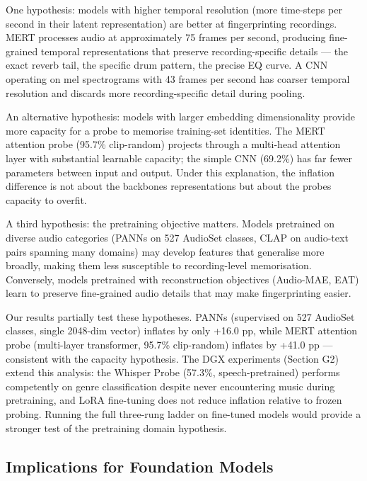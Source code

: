 \documentclass[conference]{IEEEtran}
\begin{document}
One hypothesis: models with higher temporal resolution (more time-steps
per second in their latent representation) are better at fingerprinting
recordings. MERT processes audio at approximately 75 frames per second,
producing fine-grained temporal representations that preserve
recording-specific details --- the exact reverb tail, the specific
drum pattern, the precise EQ curve. A CNN operating on mel spectrograms
with 43 frames per second has coarser temporal resolution and discards
more recording-specific detail during pooling.

An alternative hypothesis: models with larger embedding dimensionality
provide more capacity for a probe to memorise training-set identities.
The MERT attention probe (95.7\% clip-random) projects through a
multi-head attention layer with substantial learnable capacity; the
simple CNN (69.2\%) has far fewer parameters between input and output.
Under this explanation, the inflation difference is not about the
backbone\textquotesingle s representations but about the
probe\textquotesingle s capacity to overfit.

A third hypothesis: the pretraining objective matters. Models pretrained
on diverse audio categories (PANNs on 527 AudioSet classes, CLAP on
audio-text pairs spanning many domains) may develop features that
generalise more broadly, making them less susceptible to recording-level
memorisation. Conversely, models pretrained with reconstruction
objectives (Audio-MAE, EAT) learn to preserve fine-grained audio details
that may make fingerprinting easier.

Our results partially test these hypotheses. PANNs (supervised on 527
AudioSet classes, single 2048-dim vector) inflates by only +16.0 pp,
while MERT attention probe (multi-layer transformer, 95.7\% clip-random)
inflates by +41.0 pp --- consistent with the capacity hypothesis.
The DGX experiments (Section G2) extend this analysis: the Whisper Probe
(57.3\%, speech-pretrained) performs competently on genre classification
despite never encountering music during pretraining, and LoRA
fine-tuning does not reduce inflation relative to frozen probing.
Running the full three-rung ladder on fine-tuned models would provide a
stronger test of the pretraining domain hypothesis.

\subsection{Implications for Foundation
Models}\label{c.-implications-for-foundation-models}
\end{document}
